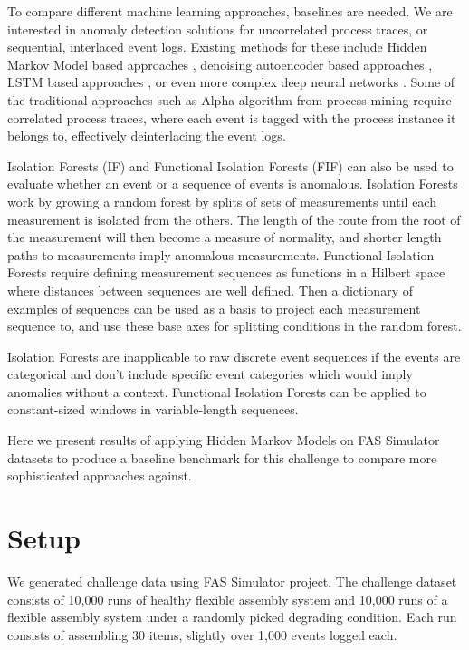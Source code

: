 \documentclass[journal]{IEEEtran}
\begin{document}
To compare different machine learning approaches, baselines are needed. We are interested in anomaly detection solutions for uncorrelated process traces, or sequential, interlaced event logs. Existing methods for these include Hidden Markov Model based approaches \cite{gornitz2015hidden}\cite{joshi2005investigating}, denoising autoencoder based approaches \cite{nolle2016unsupervised}, LSTM based approaches \cite{yuan2021recompose}\cite{du2017deeplog}, or even more complex deep neural networks \cite{zhang2019robust}. Some of the traditional approaches such as Alpha algorithm from process mining require correlated process traces, where each event is tagged with the process instance it belongs to, effectively deinterlacing the event logs.

Isolation Forests\cite{liu2008isolation} (IF) and Functional Isolation Forests\cite{staerman2019functional} (FIF) can also be used to evaluate whether an event or a sequence of events is anomalous. Isolation Forests work by growing a random forest by splits of sets of measurements until each measurement is isolated from the others. The length of the route from the root of the measurement will then become a measure of normality, and shorter length paths to measurements imply anomalous measurements. Functional Isolation Forests require defining measurement sequences as functions in a Hilbert space where distances between sequences are well defined. Then a dictionary of examples of sequences can be used as a basis to project each measurement sequence to, and use these base axes for splitting conditions in the random forest.

Isolation Forests are inapplicable to raw discrete event sequences if the events are categorical and don't include specific event categories which would imply anomalies without a context. Functional Isolation Forests can be applied to constant-sized windows in variable-length sequences.

Here we present results of applying Hidden Markov Models on FAS Simulator datasets to produce a baseline benchmark for this challenge to compare more sophisticated approaches against.

\section{Setup}

We generated challenge data using FAS Simulator project\cite{FASSimulator}. The challenge dataset consists of 10,000 runs of healthy flexible assembly system and 10,000 runs of a flexible assembly system under a randomly picked degrading condition. Each run consists of assembling 30 items, slightly over 1,000 events logged each.
\end{document}
